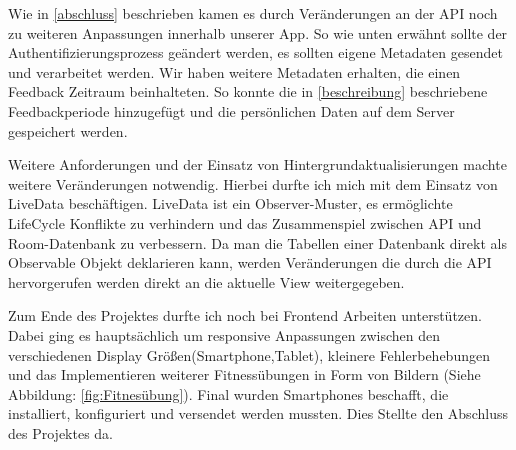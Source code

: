 Wie in \ref{abschluss} beschrieben kamen es durch Veränderungen an der API noch zu weiteren Anpassungen innerhalb unserer App. So wie unten erwähnt sollte der Authentifizierungsprozess geändert werden, es sollten eigene Metadaten gesendet und verarbeitet werden. Wir haben weitere Metadaten erhalten, die einen Feedback Zeitraum beinhalteten. So konnte die in \ref{beschreibung} beschriebene Feedbackperiode hinzugefügt und die persönlichen Daten auf dem Server gespeichert werden.


Weitere Anforderungen und der Einsatz von Hintergrundaktualisierungen machte weitere Veränderungen notwendig. Hierbei durfte ich mich mit dem Einsatz von LiveData beschäftigen. LiveData ist ein Observer-Muster, es ermöglichte  LifeCycle Konflikte zu verhindern und das Zusammenspiel zwischen API und Room-Datenbank zu verbessern. Da man die Tabellen einer Datenbank direkt als Observable Objekt deklarieren kann, werden Veränderungen die durch die  API hervorgerufen werden direkt  an die aktuelle View weitergegeben.

Zum Ende des Projektes durfte ich  noch bei Frontend Arbeiten unterstützen. Dabei ging es hauptsächlich um responsive Anpassungen zwischen den verschiedenen Display Größen(Smartphone,Tablet), kleinere Fehlerbehebungen und das Implementieren weiterer Fitnessübungen in Form von Bildern (Siehe Abbildung: \ref{fig:Fitnesübung}).
Final wurden Smartphones beschafft, die installiert, konfiguriert und versendet werden mussten. Dies Stellte den Abschluss des Projektes da.








